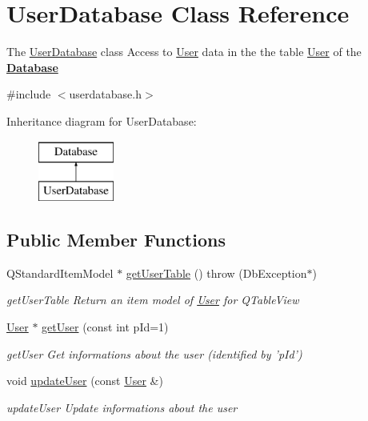 \hypertarget{classUserDatabase}{\section{User\+Database Class Reference}
\label{classUserDatabase}
}


The \hyperlink{classUserDatabase}{User\+Database} class Access to \hyperlink{classUser}{User} data in the the table \hyperlink{classUser}{User} of the {\bfseries \hyperlink{classDatabase}{Database}}  




{\ttfamily \#include $<$userdatabase.\+h$>$}

Inheritance diagram for User\+Database\+:\begin{figure}[H]
\begin{center}
\leavevmode
\includegraphics[height=2.000000cm]{de/d47/classUserDatabase}
\end{center}
\end{figure}
\subsection*{Public Member Functions}
\begin{DoxyCompactItemize}
\item 
Q\+Standard\+Item\+Model $\ast$ \hyperlink{classUserDatabase_a6020d6686916f20b3e6a1a5fa5fa7978}{get\+User\+Table} ()  throw (\+Db\+Exception$\ast$)
\begin{DoxyCompactList}\small\item\em get\+User\+Table Return an item model of \hyperlink{classUser}{User} for Q\+Table\+View \end{DoxyCompactList}\item 
\hyperlink{classUser}{User} $\ast$ \hyperlink{classUserDatabase_ab95ed012ce83d09e57ad902cc304585c}{get\+User} (const int p\+Id=1)
\begin{DoxyCompactList}\small\item\em get\+User Get informations about the user (identified by 'p\+Id') \end{DoxyCompactList}\item 
\hypertarget{classUserDatabase_a5d7ecaa321c764615ed3cff211ccd84f}{void \hyperlink{classUserDatabase_a5d7ecaa321c764615ed3cff211ccd84f}{update\+User} (const \hyperlink{classUser}{User} \&)}\label{classUserDatabase_a5d7ecaa321c764615ed3cff211ccd84f}

\begin{DoxyCompactList}\small\item\em update\+User Update informations about the user \end{DoxyCompactList}\end{DoxyCompactItemize}
